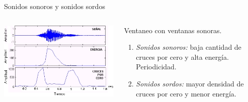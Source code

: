 \documentclass{beamer}
\begin{document}
\begin{frame}{Sonidos sonoros y sonidos sordos}

\begin{columns}
\begin{column}{0.6\linewidth}
\includegraphics[width=\linewidth]{sonoro}
\end{column}

\begin{column}{0.4\linewidth}

\begin{block}{}
Ventaneo con ventanas sonoras.
\end{block}

\begin{enumerate}
\item \textit{Sonidos sonoros:} baja cantidad de cruces por cero y alta energía. Periodicidad.
\item \textit{Sonidos sordos:} mayor densidad de cruces por cero y menor energía.
\end{enumerate}
\end{column}
\end{columns}

\end{frame}
\end{document}
